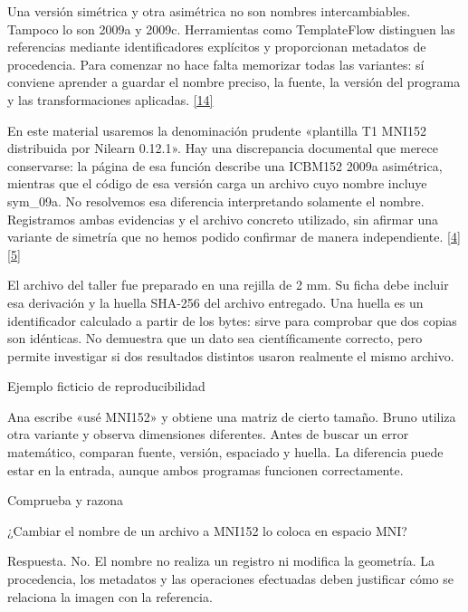 Una versión simétrica y otra asimétrica no son nombres intercambiables. Tampoco lo son 2009a y 2009c. Herramientas como TemplateFlow distinguen las referencias mediante identificadores explícitos y proporcionan metadatos de procedencia. Para comenzar no hace falta memorizar todas las variantes: sí conviene aprender a guardar el nombre preciso, la fuente, la versión del programa y las transformaciones aplicadas. \hyperlink{refR14}{[14]}


En este material usaremos la denominación prudente «plantilla T1 MNI152 distribuida por Nilearn 0.12.1». Hay una discrepancia documental que merece conservarse: la página de esa función describe una ICBM152 2009a asimétrica, mientras que el código de esa versión carga un archivo cuyo nombre incluye sym\_09a. No resolvemos esa diferencia interpretando solamente el nombre. Registramos ambas evidencias y el archivo concreto utilizado, sin afirmar una variante de simetría que no hemos podido confirmar de manera independiente. \hyperlink{refR4}{[4]} \hyperlink{refR5}{[5]}


El archivo del taller fue preparado en una rejilla de 2 mm. Su ficha debe incluir esa derivación y la huella SHA-256 del archivo entregado. Una huella es un identificador calculado a partir de los bytes: sirve para comprobar que dos copias son idénticas. No demuestra que un dato sea científicamente correcto, pero permite investigar si dos resultados distintos usaron realmente el mismo archivo.



\begin{Idea}{Ejemplo ficticio de reproducibilidad}

Ana escribe «usé MNI152» y obtiene una matriz de cierto tamaño. Bruno utiliza otra variante y observa dimensiones diferentes. Antes de buscar un error matemático, comparan fuente, versión, espaciado y huella. La diferencia puede estar en la entrada, aunque ambos programas funcionen correctamente.


\end{Idea}


\begin{Practica}{Comprueba y razona}

¿Cambiar el nombre de un archivo a MNI152 lo coloca en espacio MNI?


Respuesta. No. El nombre no realiza un registro ni modifica la geometría. La procedencia, los metadatos y las operaciones efectuadas deben justificar cómo se relaciona la imagen con la referencia.


\end{Practica}

